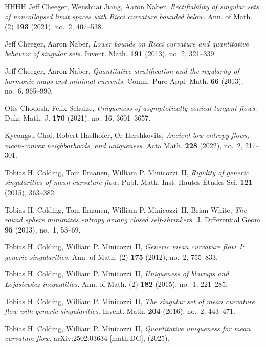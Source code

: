 \documentclass[11pt,reqno]{amsart}
\numberwithin{equation}{section}
\theoremstyle{definition}
\theoremstyle{remark}
\theoremstyle{remark}
\theoremstyle{remark}
\theoremstyle{remark}\newtheorem{conjecture}[equation]{Conjecture}
\theoremstyle{remark}\newtheorem{question}[equation]{Question}
\begin{document}
\begin{thebibliography}{HHHH}
Jeff Cheeger, Wenshuai Jiang, Aaron Naber,
\emph{Rectifiability of singular sets of noncollapsed limit spaces with Ricci curvature bounded below.}
Ann. of Math. (2) \textbf{193} (2021), no.~2, 407–538.

Jeff Cheeger, Aaron Naber,
\emph{Lower bounds on Ricci curvature and quantitative behavior of singular sets.} Invent. Math. \textbf{191} (2013), no. 2, 321–339.



Jeff Cheeger, Aaron Naber,
\emph{Quantitative stratification and the regularity of harmonic maps and minimal currents.}
Comm. Pure Appl. Math. \textbf{66} (2013), no.~6, 965–990.

Otis Chodosh, Felix Schulze,
\emph{Uniqueness of asymptotically conical tangent flows.}
Duke Math. J. \textbf{170} (2021), no.~16, 3601–3657.

Kyeongsu Choi, Robert Haslhofer, Or Hershkovits,
\emph{Ancient low-entropy flows, mean-convex neighborhoods, and uniqueness.}
Acta Math. \textbf{228} (2022), no.~2, 217–301.


Tobias H. Colding, Tom Ilmanen, William P. Minicozzi~II,
\emph{Rigidity of generic singularities of mean curvature flow.}
Publ. Math. Inst. Hautes Études Sci. \textbf{121} (2015), 363–382.

Tobias H. Colding, Tom Ilmanen, William P. Minicozzi~II, Brian White,
\emph{The round sphere minimizes entropy among closed self-shrinkers.}
J. Differential Geom. \textbf{95} (2013), no.~1, 53–69.

Tobias H. Colding, William P. Minicozzi~II,
\emph{Generic mean curvature flow~I: generic singularities.}
Ann. of Math. (2) \textbf{175} (2012), no.~2, 755–833.

Tobias H. Colding, William P. Minicozzi~II,
\emph{Uniqueness of blowups and Łojasiewicz inequalities.}
Ann. of Math. (2) \textbf{182} (2015), no.~1, 221–285.

Tobias H. Colding, William P. Minicozzi~II,
\emph{The singular set of mean curvature flow with generic singularities.}
Invent. Math. \textbf{204} (2016), no.~2, 443–471.

Tobias H. Colding, William P. Minicozzi~II,
\emph{Quantitative uniqueness for mean curvature flow.}
arXiv:2502.03634 [math.DG], (2025).


\end{thebibliography}
\end{document}
